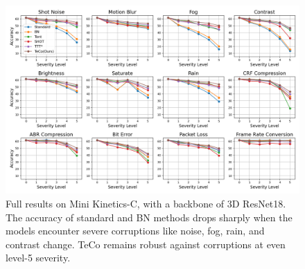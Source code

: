 \documentclass{article} %
\begin{document}
\begin{table}[htp]
\caption{mPC across architectures on Mini Kinetics-C and Mini SSV2-C. TeCo outperforms other baseline methods on different architectures and datasets. \textbf{Clean Acc} is the accuracy of model tested on clean data.}
\label{mPC-table}
\begin{center}
\end{center}
\vspace{-0.7cm}
\end{table}

\begin{figure}[t]
\begin{center}
        \includegraphics[width=0.85\linewidth]{./images/kinetics-I3D-RESNET18-full-plot-v2.png}
\end{center}
\caption{Full results on Mini Kinetics-C, with a backbone of 3D ResNet18. The accuracy of standard and BN methods drops sharply when the models encounter severe corruptions like noise, fog, rain, and contrast change. TeCo remains robust against corruptions at even level-5 severity.}
\vspace{-0.3cm}
\label{fig:full-kinetics-c}
\end{figure}
\end{document}
